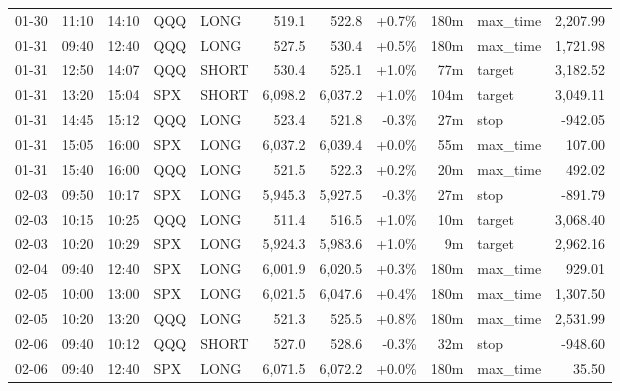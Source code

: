 \documentclass[11pt,a4paper,twoside]{article}
\begin{document}
\begin{center}
\begin{longtable}{>{\color{txtmain}}l l l l l r r r r >{\color{txtmain}}l r}
01-30 & 11:10 & 14:10 & QQQ & LONG & 519.1 & 522.8 & \textcolor{wingreen}{+0.7\%} & 180m & max\_time & \textcolor{wingreen}{2,207.99} \\
01-31 & 09:40 & 12:40 & QQQ & LONG & 527.5 & 530.4 & \textcolor{wingreen}{+0.5\%} & 180m & max\_time & \textcolor{wingreen}{1,721.98} \\
01-31 & 12:50 & 14:07 & QQQ & SHORT & 530.4 & 525.1 & \textcolor{wingreen}{+1.0\%} & 77m & target & \textcolor{wingreen}{3,182.52} \\
01-31 & 13:20 & 15:04 & SPX & SHORT & 6,098.2 & 6,037.2 & \textcolor{wingreen}{+1.0\%} & 104m & target & \textcolor{wingreen}{3,049.11} \\
01-31 & 14:45 & 15:12 & QQQ & LONG & 523.4 & 521.8 & \textcolor{lossred}{-0.3\%} & 27m & stop & \textcolor{lossred}{-942.05} \\
01-31 & 15:05 & 16:00 & SPX & LONG & 6,037.2 & 6,039.4 & \textcolor{wingreen}{+0.0\%} & 55m & max\_time & \textcolor{wingreen}{107.00} \\
01-31 & 15:40 & 16:00 & QQQ & LONG & 521.5 & 522.3 & \textcolor{wingreen}{+0.2\%} & 20m & max\_time & \textcolor{wingreen}{492.02} \\
02-03 & 09:50 & 10:17 & SPX & LONG & 5,945.3 & 5,927.5 & \textcolor{lossred}{-0.3\%} & 27m & stop & \textcolor{lossred}{-891.79} \\
02-03 & 10:15 & 10:25 & QQQ & LONG & 511.4 & 516.5 & \textcolor{wingreen}{+1.0\%} & 10m & target & \textcolor{wingreen}{3,068.40} \\
02-03 & 10:20 & 10:29 & SPX & LONG & 5,924.3 & 5,983.6 & \textcolor{wingreen}{+1.0\%} & 9m & target & \textcolor{wingreen}{2,962.16} \\
02-04 & 09:40 & 12:40 & SPX & LONG & 6,001.9 & 6,020.5 & \textcolor{wingreen}{+0.3\%} & 180m & max\_time & \textcolor{wingreen}{929.01} \\
02-05 & 10:00 & 13:00 & SPX & LONG & 6,021.5 & 6,047.6 & \textcolor{wingreen}{+0.4\%} & 180m & max\_time & \textcolor{wingreen}{1,307.50} \\
02-05 & 10:20 & 13:20 & QQQ & LONG & 521.3 & 525.5 & \textcolor{wingreen}{+0.8\%} & 180m & max\_time & \textcolor{wingreen}{2,531.99} \\
02-06 & 09:40 & 10:12 & QQQ & SHORT & 527.0 & 528.6 & \textcolor{lossred}{-0.3\%} & 32m & stop & \textcolor{lossred}{-948.60} \\
02-06 & 09:40 & 12:40 & SPX & LONG & 6,071.5 & 6,072.2 & \textcolor{wingreen}{+0.0\%} & 180m & max\_time & \textcolor{wingreen}{35.50} \\

\end{longtable}
\end{center}
\end{document}
